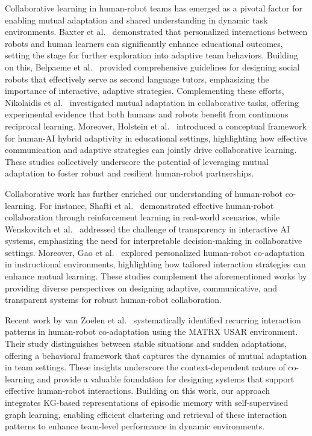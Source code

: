 \documentclass[letterpaper]{article} %
\begin{document}
Collaborative learning in human-robot teams has emerged as a pivotal factor for enabling mutual adaptation and shared understanding in dynamic task environments. Baxter et al.~\cite{Baxter2017RobotEP} demonstrated that personalized interactions between robots and human learners can significantly enhance educational outcomes, setting the stage for further exploration into adaptive team behaviors. Building on this, Belpaeme et al.~\cite{Belpaeme2018} provided comprehensive guidelines for designing social robots that effectively serve as second language tutors, emphasizing the importance of interactive, adaptive strategies. Complementing these efforts, Nikolaidis et al.~\cite{Nikolaidis} investigated mutual adaptation in collaborative tasks, offering experimental evidence that both humans and robots benefit from continuous reciprocal learning. Moreover, Holstein et al.~\cite{Holstein} introduced a conceptual framework for human-AI hybrid adaptivity in educational settings, highlighting how effective communication and adaptive strategies can jointly drive collaborative learning. These studies collectively underscore the potential of leveraging mutual adaptation to foster robust and resilient human-robot partnerships.

Collaborative work has further enriched our understanding of human-robot co-learning. For instance, Shafti et al.~\cite{DBLP:journals/corr/abs-2003-01156} demonstrated effective human-robot collaboration through reinforcement learning in real-world scenarios, while Wenskovitch et al.~\cite{WenskovitchInteractiveAD} addressed the challenge of transparency in interactive AI systems, emphasizing the need for interpretable decision-making in collaborative settings. Moreover, Gao et al.~\cite{gao} explored personalized human-robot co-adaptation in instructional environments, highlighting how tailored interaction strategies can enhance mutual learning. These studies complement the aforementioned works by providing diverse perspectives on designing adaptive, communicative, and transparent systems for robust human-robot collaboration.

Recent work by van Zoelen et al.~\cite{10.1145/3434074.3446354,vanZoelen2021,vanZoelen2022} systematically identified recurring interaction patterns in human-robot co-adaptation using the MATRX USAR environment. Their study distinguishes between stable situations and sudden adaptations, offering a behavioral framework that captures the dynamics of mutual adaptation in team settings. These insights underscore the context-dependent nature of co-learning and provide a valuable foundation for designing systems that support effective human-robot interactions. Building on this work, our approach integrates KG-based representations of episodic memory with self-supervised graph learning, enabling efficient clustering and retrieval of these interaction patterns to enhance team-level performance in dynamic environments.
\end{document}
